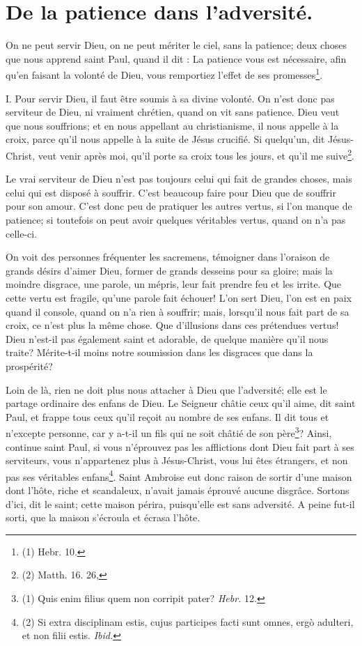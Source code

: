\documentclass[instructions.tex]{subfiles}
\begin{document}
 
\chapter{De la patience dans l'adversité.}
 
On ne peut servir Dieu, on ne peut mériter le ciel, sans la patience; deux choses que nous apprend saint Paul, quand il dit : La patience vous est nécessaire, afin qu'en faisant la volonté de Dieu, vous remportiez l'effet de ses promesses\footnote{(1) Hebr. 10.}.
 
I. Pour servir Dieu, il faut être soumis à sa divine volonté. On n'est donc pas serviteur de Dieu, ni vraiment chrétien, quand on vit sans patience. Dieu veut que nous souffrions; et en nous appellant au christianisme, il nous appelle à la croix, parce qu'il nous appelle à la suite de Jésus crucifié. Si quelqu'un, dit Jésus-Christ, veut venir après moi, qu'il porte sa croix tous les jours, et qu'il me suive\footnote{(2) Matth. 16. 26,}.
 
Le vrai serviteur de Dieu n'est pas toujours celui qui fait de grandes choses, mais celui qui est disposé à souffrir. C'est beaucoup faire pour Dieu que de souffrir pour son amour. C'est donc peu de pratiquer les autres vertus, si l'on manque de patience; si toutefois on peut avoir quelques véritables vertus, quand on n'a pas celle-ci.
 
On voit des personnes fréquenter les sacremens, témoigner dans l'oraison de grands désirs d'aimer Dieu, former de grands desseins pour sa gloire; mais la moindre disgrace, une parole, un mépris, leur fait prendre feu et les irrite. Que cette vertu est fragile, qu'une parole fait échouer! L'on sert Dieu, l'on est en paix quand il console, quand on n'a rien à souffrir; mais, lorsqu'il nous fait part de sa croix, ce n'est plus la même chose. Que d'illusions dans ces prétendues vertus! Dieu n'est-il pas également saint et adorable, de quelque manière qu'il nous traite? Mérite-t-il moins notre soumission dans les disgraces que dans la prospérité?
 
Loin de là, rien ne doit plus nous attacher à Dieu que l'adversité; elle est le partage ordinaire des enfans de Dieu. Le Seigneur châtie ceux qu'il aime, dit saint Paul, et frappe tous ceux qu'il reçoit au nombre de ses enfans. Il dit tous et n'excepte personne, car y a-t-il un fils qui ne soit châtié de son père\footnote{(1) Quis enim filius quem non corripit pater? \textit{Hebr.} 12.}? Ainsi, continue saint Paul, si vous n'éprouvez pas les afflictions dont Dieu fait part à ses serviteurs, vous n'appartenez plus à Jésus-Christ, vous lui êtes étrangers, et non pas ses véritables enfans\footnote{(2) Si extra disciplinam estis, cujus participes facti sunt omnes, ergò adulteri, et non filii estis. \textit{Ibid.}}. Saint Ambroise eut donc raison de sortir d'une maison dont l'hôte, riche et scandaleux, n'avait jamais éprouvé aucune disgrâce. Sortons d'ici, dit le saint; cette maison périra, puisqu'elle est sans adversité. A peine fut-il sorti, que la maison s'écroula et écrasa l'hôte.
 
\end{document}
